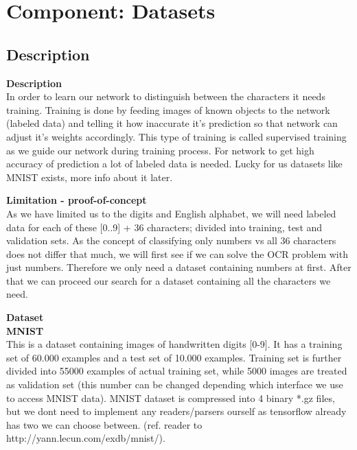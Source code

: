 \documentclass[Report.tex]{subfiles}
\begin{document}
\section{Component: Datasets}
\label{Method:Datasets}
\subsection{Description}

\begin{flushleft}
  \textbf{Description} \\
  In order to learn our network to distinguish between the characters it needs training. Training is done by feeding images of known objects to the network (labeled data) and telling it how inaccurate it's prediction so that network can adjust it's weights accordingly. This type of training is called supervised training as we guide our network during training process.
For network to get high accuracy of prediction a lot of labeled data is needed. Lucky for us datasets like MNIST exists, more info about it later.
\end{flushleft}

\begin{flushleft}
  \textbf{Limitation - proof-of-concept} \\
  As we have limited us to the digits and English alphabet, we will need labeled data for each of these [0..9] + 36 characters; divided into training, test and validation sets. As the concept of classifying only numbers vs all 36 characters does not differ that much, we will first see if we can solve the OCR problem with just numbers. Therefore we only need a dataset containing numbers at first. After that we can proceed our search for a dataset containing all the characters we need.
\end{flushleft}

\begin{flushleft}
  \textbf{Dataset} \\
  \textbf{MNIST} \\
  This is a dataset containing images of handwritten digits [0-9]. It has a training set of 60.000 examples and a test set of 10.000 examples. Training set is further divided into 55000 examples of actual training set, while 5000 images are treated as validation set (this number can be changed depending which interface we use to access MNIST data).
MNIST dataset is compressed into 4 binary *.gz files, but we dont need to implement any readers/parsers ourself as tensorflow already has two we can choose between.
(ref. reader to http://yann.lecun.com/exdb/mnist/).
\end{flushleft}
\end{document}
